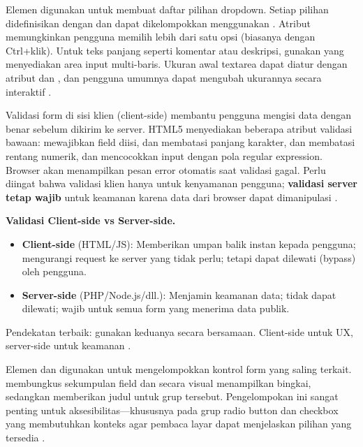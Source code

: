 Elemen  digunakan untuk membuat daftar pilihan dropdown. Setiap pilihan didefinisikan dengan  dan dapat dikelompokkan menggunakan . Atribut  memungkinkan pengguna memilih lebih dari satu opsi (biasanya dengan Ctrl+klik). Untuk teks panjang seperti komentar atau deskripsi, gunakan  yang menyediakan area input multi-baris. Ukuran awal textarea dapat diatur dengan atribut  dan , dan pengguna umumnya dapat mengubah ukurannya secara interaktif \cite{webdevHtml}.

Validasi form di sisi klien (client-side) membantu pengguna mengisi data dengan benar sebelum dikirim ke server. HTML5 menyediakan beberapa atribut validasi bawaan:  mewajibkan field diisi,  dan  membatasi panjang karakter,  dan  membatasi rentang numerik, dan  mencocokkan input dengan pola regular expression. Browser akan menampilkan pesan error otomatis saat validasi gagal. Perlu diingat bahwa validasi klien hanya untuk kenyamanan pengguna; \textbf{validasi server tetap wajib} untuk keamanan karena data dari browser dapat dimanipulasi \cite{whatwgHtml}.

\begin{konsep}
\textbf{Validasi Client-side vs Server-side.}
\begin{itemize}
  \item \textbf{Client-side} (HTML/JS): Memberikan umpan balik instan kepada pengguna; mengurangi request ke server yang tidak perlu; tetapi dapat dilewati (bypass) oleh pengguna.
  \item \textbf{Server-side} (PHP/Node.js/dll.): Menjamin keamanan data; tidak dapat dilewati; wajib untuk semua form yang menerima data publik.
\end{itemize}
Pendekatan terbaik: gunakan keduanya secara bersamaan. Client-side untuk UX, server-side untuk keamanan \cite{mdnHtmlIntro}.
\end{konsep}

Elemen  dan  digunakan untuk mengelompokkan kontrol form yang saling terkait.  membungkus sekumpulan field dan secara visual menampilkan bingkai, sedangkan  memberikan judul untuk grup tersebut. Pengelompokan ini sangat penting untuk aksesibilitas---khususnya pada grup radio button dan checkbox yang membutuhkan konteks agar pembaca layar dapat menjelaskan pilihan yang tersedia \cite{webdevAccessibility}.

